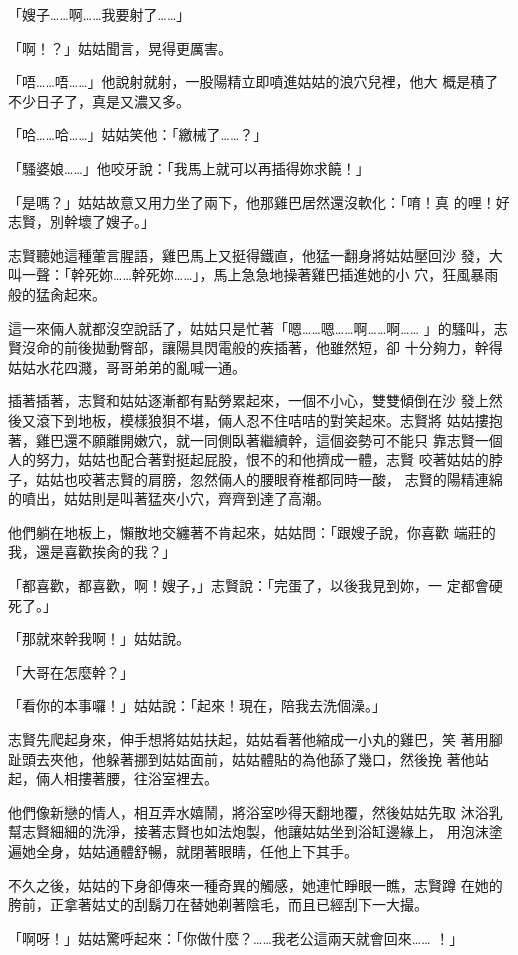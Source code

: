 「嫂子……啊……我要射了……」

「啊！？」姑姑聞言，晃得更厲害。

「唔……唔……」他說射就射，一股陽精立即噴進姑姑的浪穴兒裡，他大
概是積了不少日子了，真是又濃又多。

「哈……哈……」姑姑笑他：「繳械了……？」

「騷婆娘……」他咬牙說：「我馬上就可以再插得妳求饒！」

「是嗎？」姑姑故意又用力坐了兩下，他那雞巴居然還沒軟化：「唷！真
的哩！好志賢，別幹壞了嫂子。」

志賢聽她這種葷言腥語，雞巴馬上又挺得鐵直，他猛一翻身將姑姑壓回沙
發，大叫一聲：「幹死妳……幹死妳……」，馬上急急地操著雞巴插進她的小
穴，狂風暴雨般的猛肏起來。

這一來倆人就都沒空說話了，姑姑只是忙著「嗯……嗯……啊……啊……
」的騷叫，志賢沒命的前後拋動臀部，讓陽具閃電般的疾插著，他雖然短，卻
十分夠力，幹得姑姑水花四濺，哥哥弟弟的亂喊一通。

插著插著，志賢和姑姑逐漸都有點勞累起來，一個不小心，雙雙傾倒在沙
發上然後又滾下到地板，模樣狼狽不堪，倆人忍不住咭咭的對笑起來。志賢將
姑姑摟抱著，雞巴還不願離開嫩穴，就一同側臥著繼續幹，這個姿勢可不能只
靠志賢一個人的努力，姑姑也配合著對挺起屁股，恨不的和他擠成一體，志賢
咬著姑姑的脖子，姑姑也咬著志賢的肩膀，忽然倆人的腰眼脊椎都同時一酸，
志賢的陽精連綿的噴出，姑姑則是叫著猛夾小穴，齊齊到達了高潮。

他們躺在地板上，懶散地交纏著不肯起來，姑姑問：「跟嫂子說，你喜歡
端莊的我，還是喜歡挨肏的我？」

「都喜歡，都喜歡，啊！嫂子，」志賢說：「完蛋了，以後我見到妳，一
定都會硬死了。」

「那就來幹我啊！」姑姑說。

「大哥在怎麼幹？」

「看你的本事囉！」姑姑說：「起來！現在，陪我去洗個澡。」

志賢先爬起身來，伸手想將姑姑扶起，姑姑看著他縮成一小丸的雞巴，笑
著用腳趾頭去夾他，他躲著挪到姑姑面前，姑姑體貼的為他舔了幾口，然後挽
著他站起，倆人相摟著腰，往浴室裡去。

他們像新戀的情人，相互弄水嬉鬧，將浴室吵得天翻地覆，然後姑姑先取
沐浴乳幫志賢細細的洗淨，接著志賢也如法炮製，他讓姑姑坐到浴缸邊緣上，
用泡沫塗遍她全身，姑姑通體舒暢，就閉著眼睛，任他上下其手。

不久之後，姑姑的下身卻傳來一種奇異的觸感，她連忙睜眼一瞧，志賢蹲
在她的胯前，正拿著姑丈的刮鬍刀在替她剃著陰毛，而且已經刮下一大撮。

「啊呀！」姑姑驚呼起來：「你做什麼？……我老公這兩天就會回來……
！」

